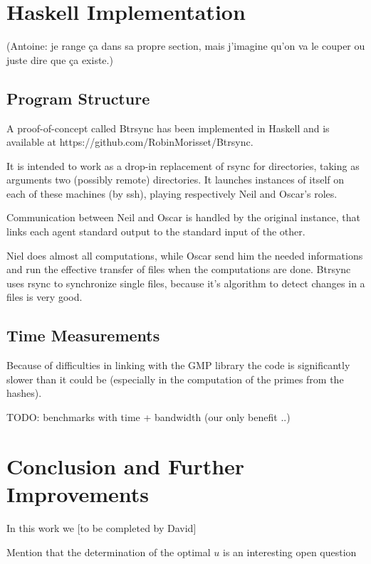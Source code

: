 \documentclass[11pt]{llncs}
\begin{document}
\section{Haskell Implementation}

(Antoine: je range ça dans sa propre section, mais j'imagine qu'on va le couper
ou juste dire que ça existe.)

\subsection{Program Structure}

A proof-of-concept called Btrsync has been implemented in Haskell and is
available at https://github.com/RobinMorisset/Btrsync.

It is intended to work as a drop-in replacement of rsync for directories, taking
as arguments two (possibly remote) directories. It launches instances of itself
on each of these machines (by ssh), playing respectively Neil and Oscar's roles.

Communication between Neil and Oscar is handled by the original instance, that
links each agent standard output to the standard input of the other.

Niel does almost all computations, while Oscar send him the needed
informations and run the effective transfer of files when the
computations are done. Btrsync uses rsync to synchronize single files,
because it's algorithm to detect changes in a files is very good.

\subsection{Time Measurements}

Because of difficulties in linking with the GMP library the code is 
significantly slower than it could be (especially in the computation of the
primes from the hashes).

TODO: benchmarks with time + bandwidth (our only benefit ..)




\section{Conclusion and Further Improvements}

In this work we [to be completed by David]\smallskip

Mention that the determination of the optimal $u$ is an interesting open question
\end{document}

